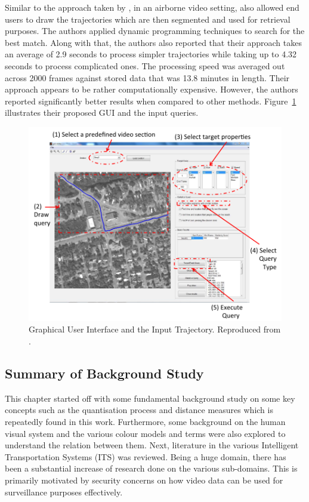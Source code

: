 Similar to the approach taken by \cite{lai2015video}, in an airborne video
setting,  also allowed end users to draw the
trajectories which are then segmented and used for retrieval purposes. The
authors applied dynamic programming techniques to search for the best match.
Along with that, the authors also reported that their approach takes an average
of 2.9 seconds to process simpler trajectories while taking up to 4.32 seconds to process complicated ones. The processing speed was averaged out across 2000
frames against stored data that was 13.8 minutes in length. Their approach appears to be rather computationally expensive. However, the authors reported significantly
better results when compared to other methods. Figure~\ref{fig:drawquery2}
illustrates their proposed GUI and the input queries.
\begin{figure}[hbt!]
  \centering
  \includegraphics[width=.6\textwidth]{image/lit/trajdraw2.PNG}
  \caption[Graphical User Interface and the Input Trajectory] {Graphical User
  Interface and the Input Trajectory. Reproduced from
  .}
\label{fig:drawquery2}
\end{figure}

\vspace{1em}
\subsection{Summary of Background Study}

This chapter started off with some  fundamental background study on some key concepts such as the quantisation process and distance measures which is repeatedly found in this work. Furthermore, some background on the human visual system and the various colour models and terms were also explored to understand the relation between them. 
Next, literature in the various Intelligent Transportation Systems (ITS) was reviewed. Being a huge domain, there has been a substantial increase of research done on the various sub-domains. This is 
primarily motivated by security concerns on how video data can be used for surveillance purposes effectively.

